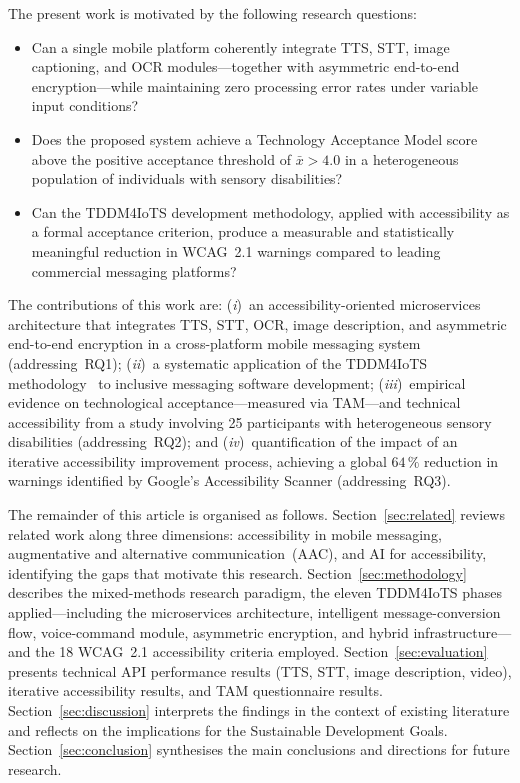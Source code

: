 \documentclass[journal]{IEEEtran}
\begin{document}
	The present work is motivated by the following research questions:
	\begin{itemize}
		\item[\textbf{RQ1}] Can a single mobile platform coherently integrate TTS, STT, image captioning, and OCR modules---together with asymmetric end-to-end encryption---while maintaining zero processing error rates under variable input conditions?
		\item[\textbf{RQ2}] Does the proposed system achieve a Technology Acceptance Model score above the positive acceptance threshold of $\bar{x}{>}4.0$ in a heterogeneous population of individuals with sensory disabilities?
		\item[\textbf{RQ3}] Can the TDDM4IoTS development methodology, applied with accessibility as a formal acceptance criterion, produce a measurable and statistically meaningful reduction in WCAG~2.1 warnings compared to leading commercial messaging platforms?
	\end{itemize}
	
	The contributions of this work are: (\textit{i})~an accessibility-oriented microservices architecture that integrates TTS, STT, OCR, image description, and asymmetric end-to-end encryption in a cross-platform mobile messaging system (addressing~RQ1); (\textit{ii})~a systematic application of the TDDM4IoTS methodology~\cite{guerrero2020} to inclusive messaging software development; (\textit{iii})~empirical evidence on technological acceptance---measured via TAM---and technical accessibility from a study involving 25 participants with heterogeneous sensory disabilities (addressing~RQ2); and (\textit{iv})~quantification of the impact of an iterative accessibility improvement process, achieving a global $64\,\%$ reduction in warnings identified by Google's Accessibility Scanner (addressing~RQ3).
	
	The remainder of this article is organised as follows. Section~\ref{sec:related} reviews related work along three dimensions: accessibility in mobile messaging, augmentative and alternative communication~(AAC), and AI for accessibility, identifying the gaps that motivate this research. Section~\ref{sec:methodology} describes the mixed-methods research paradigm, the eleven TDDM4IoTS phases applied---including the microservices architecture, intelligent message-conversion flow, voice-command module, asymmetric encryption, and hybrid infrastructure---and the 18 WCAG~2.1 accessibility criteria employed. Section~\ref{sec:evaluation} presents technical API performance results (TTS, STT, image description, video), iterative accessibility results, and TAM questionnaire results. Section~\ref{sec:discussion} interprets the findings in the context of existing literature and reflects on the implications for the Sustainable Development Goals. Section~\ref{sec:conclusion} synthesises the main conclusions and directions for future research.
	
\end{document}
